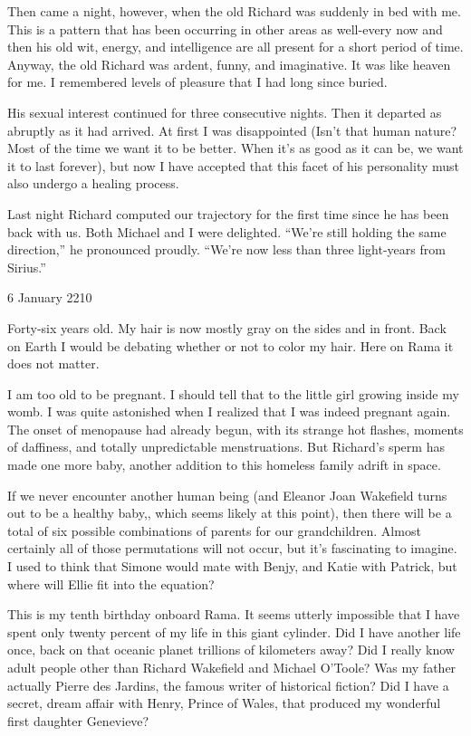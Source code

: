 \documentclass[]{article}
\begin{document}
{Then came a night, however, when the old Richard was suddenly in bed with me.  This is a pattern that has been occurring in other areas as well-every now and then his old wit, energy, and intelligence are all present for a short period of time.  Anyway, the old Richard was ardent, funny, and imaginative.  It was like heaven for me.  I remembered levels of pleasure that I had long since buried.

His sexual interest continued for three consecutive nights.  Then it departed as abruptly as it had arrived.  At first I was disappointed (Isn’t that human nature? Most of the time we want it to be better.  When it’s as good as it can be, we want it to last forever), but now I have accepted that this facet of his personality must also undergo a healing process.

Last night Richard computed our trajectory for the first time since he has been back with us.  Both Michael and I were delighted.  “We’re still holding the same direction,” he pronounced proudly.  “We’re now less than three light-years from Sirius.”

6 January 2210

Forty-six years old.  My hair is now mostly gray on the sides and in front.  Back on Earth I would be debating whether or not to color my hair.  Here on Rama it does not matter.

I am too old to be pregnant.  I should tell that to the little girl growing inside my womb.  I was quite astonished when I realized that I was indeed pregnant again.  The onset of menopause had already begun, with its strange hot flashes, moments of daffiness, and totally unpredictable menstruations.  But Richard’s sperm has made one more baby, another addition to this homeless family adrift in space.

If we never encounter another human being (and Eleanor Joan Wakefield turns out to be a healthy baby,, which seems likely at this point), then there will be a total of six possible combinations of parents for our grandchildren.  Almost certainly all of those permutations will not occur, but it’s fascinating to imagine.  I used to think that Simone would mate with Benjy, and Katie with Patrick, but where will Ellie fit into the equation?

This is my tenth birthday onboard Rama.  It seems utterly impossible that I have spent only twenty percent of my life in this giant cylinder.  Did I have another life once, back on that oceanic planet trillions of kilometers away? Did I really know adult people other than Richard Wakefield and Michael O’Toole? Was my father actually Pierre des Jardins, the famous writer of historical fiction? Did I have a secret, dream affair with Henry, Prince of Wales, that produced my wonderful first daughter Genevieve?

}
\end{document}
